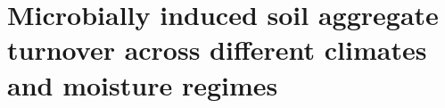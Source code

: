 \chapter{Microbially induced soil aggregate turnover across different climates and moisture regimes}
\label{chap:manuscript4} %